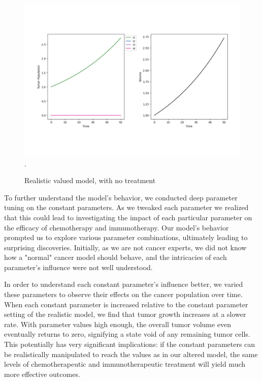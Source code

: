 \documentclass[11pt,reqno]{amsart}
\begin{document}
\begin{figure}[h]
\begin{center} %
\includegraphics[width=\textwidth]{parameters_like_paper_no_treatment.pdf}. %
\end{center}
\caption{Realistic valued model, with no treatment}
\label{fig:3}
\end{figure}

To further understand the model's behavior, we conducted deep parameter tuning on the constant parameters. As we tweaked each parameter we realized that this could lead to investigating the impact of each particular parameter on the efficacy of chemotherapy and immunotherapy. Our model's behavior prompted us to explore various parameter combinations, ultimately leading to surprising discoveries. Initially, as we are not cancer experts, we did not know how a "normal" cancer model should behave, and the intricacies of each parameter's influence were not well understood. 

In order to understand each constant parameter's influence better, we varied these parameters to observe their effects on the cancer population over time. When each constant parameter is increased relative to the constant parameter setting of the realistic model, we find that tumor growth increases at a slower rate. With parameter values high enough, the overall tumor volume even eventually returns to zero, signifying a state void of any remaining tumor cells. This potentially has very significant implications: if the constant parameters can be realistically manipulated to reach the values as in our altered model, the same levels of chemotherapeutic and immunotherapeutic treatment will yield much more effective outcomes. 
\end{document}
